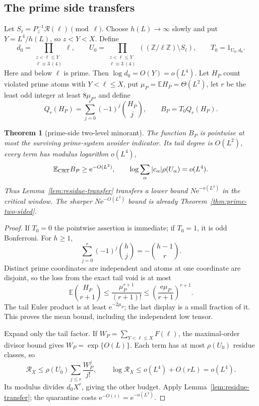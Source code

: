 \documentclass[10pt,reqno]{amsart}
\newtheorem{theorem}{Theorem}[section]
\theoremstyle{definition}
\newcommand{\Rcal}{\mathscr R}
\newcommand{\e}{\mathrm e}
\newcommand{\1}{\mathbf 1}
\begin{document}
\subsection{The prime side transfers}
Let $S_\ell=P_z^{-1}\Rcal(\ell)\pmod\ell$.  Choose $h(L)\to\infty$ slowly and put $Y=L^4/h(L)$, so $z<Y<X$.  Define
\[
 d_0=\prod_{\substack{z<\ell\leq Y\\\ell\equiv3\ (4)}}\ell,
 \qquad
 U_0=\prod_{\substack{z<\ell\leq Y\\\ell\equiv3\ (4)}}
 ((\mathbb Z/\ell\mathbb Z)\setminus S_\ell),
 \qquad T_0=1_{U_0,d_0}.
\]
Here and below $\ell$ is prime.  Then $\log d_0=O(Y)=o(L^4)$.  Let $H_P$ count violated prime atoms with $Y<\ell\leq X$, put $\mu_P=\mathbb EH_P=\Theta(L^2)$, let $r$ be the least odd integer at least $8\mu_P$, and define
\[
 Q_r(H_P)=\sum_{j=0}^r(-1)^j\binom{H_P}{j},\qquad B_P=T_0Q_r(H_P).
\]

\begin{theorem}[prime-side two-level minorant]\label{thm:prime-transfer}
The function $B_P$ is pointwise at most the surviving prime-system avoider indicator.  Its tail degree is $O(L^2)$, every term has modulus logarithm $o(L^4)$,
\[
 \mathbb E_{\rm CRT}B_P\geq\e^{-O(L^2)},
 \qquad
 \log\sum_\alpha|c_\alpha|\rho(U_\alpha)=o(L^4).
\]
Thus Lemma~\ref{lem:residue-transfer} transfers a lower bound $N\e^{-o(L^3)}$ in the critical window.  The sharper $N\e^{-O(L^2)}$ bound is already Theorem~\ref{thm:prime-two-sided}.
\end{theorem}
\begin{proof}
If $T_0=0$ the pointwise assertion is immediate; if $T_0=1$, it is odd Bonferroni.  For $h\geq1$,
\[
 \sum_{j=0}^r(-1)^j\binom{h}{j}=-\binom{h-1}{r}.
\]
Distinct prime coordinates are independent and atoms at one coordinate are disjoint, so the loss from the exact tail void is at most
\[
 \mathbb E\binom{H_P}{r+1}\leq\frac{\mu_P^{r+1}}{(r+1)!}
 \leq\left(\frac{\e\mu_P}{r+1}\right)^{r+1}.
\]
The tail Euler product is at least $\e^{-2\mu_P}$; the last display is a small fraction of it.  This proves the mean bound, including the independent low tensor.

Expand only the tail factor.  If $W_P=\sum_{Y<\ell\leq X}F(\ell)$, the maximal-order divisor bound gives $W_P=\exp\{O(L)\}$.  Each term has at most $\rho(U_0)$ residue classes, so
\[
 \mathcal R_X\leq\rho(U_0)\sum_{j\leq r}\frac{W_P^j}{j!},
 \qquad \log\mathcal R_X\leq o(L^4)+O(rL)=o(L^4).
\]
Its modulus divides $d_0X^r$, giving the other budget.  Apply Lemma~\ref{lem:residue-transfer}; the quarantine costs $\e^{-O(z)}=\e^{-o(L^3)}$.
\end{proof}
\end{document}
